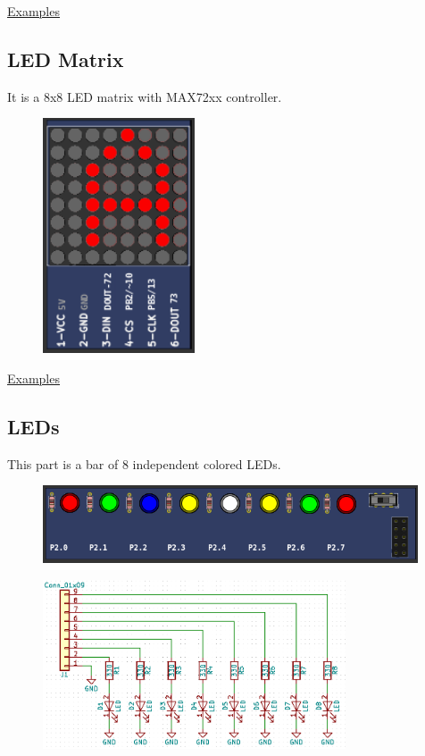 \href{https://lcgamboa.github.io/picsimlab_examples/parts_LCD_ssd1306.html}{Examples}

\vspace{0.5cm}


\subsection{LED Matrix}

It is a 8x8 LED matrix with MAX72xx controller.

\begin{figure}[H]
\center
\includegraphics[width=0.4\textwidth]{img/part_LED_matrix.png} 
\end{figure}

\href{https://lcgamboa.github.io/picsimlab_examples/parts_LED_Matrix.html}{Examples}

\subsection{LEDs}

This part is a bar of 8 independent colored LEDs.

\begin{figure}[H]
\center
\includegraphics[width=0.99\textwidth]{img/part_leds.png} 
\end{figure} 

\begin{figure}[H]
\center
\includegraphics[width=0.8\textwidth]{img/part_leds_.png} 
\end{figure} 

